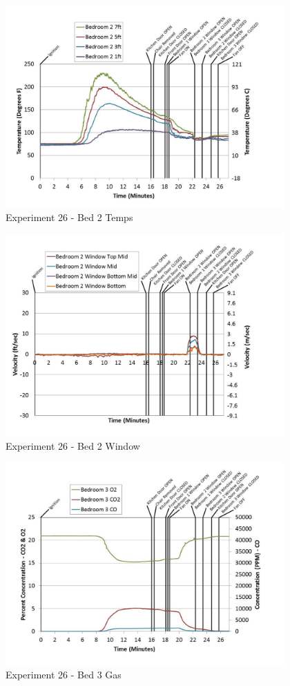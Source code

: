 \documentclass{article}
\begin{document}
\begin{appendices}
	\begin{figure}[h!]
		\centering
		\includegraphics[height=3.05in]{0_Images/Results_Charts/Exp_26_Charts/Bed2Temps.pdf}
		\caption{Experiment 26 - Bed 2 Temps}
	\end{figure}
 
	\clearpage

	\begin{figure}[h!]
		\centering
		\includegraphics[height=3.05in]{0_Images/Results_Charts/Exp_26_Charts/Bed2Window.pdf}
		\caption{Experiment 26 - Bed 2 Window}
	\end{figure}
 

	\begin{figure}[h!]
		\centering
		\includegraphics[height=3.05in]{0_Images/Results_Charts/Exp_26_Charts/Bed3Gas.pdf}
		\caption{Experiment 26 - Bed 3 Gas}
	\end{figure}
 

\end{appendices}
\end{document}

